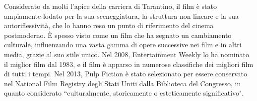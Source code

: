 \documentclass[12pt]{article} %
\begin{document}
\begin{flushleft}
    Considerato da molti l'apice della carriera di Tarantino, il film è stato ampiamente lodato per la sua sceneggiatura, la struttura non lineare e la sua autoriflessività, 
    che lo hanno reso un punto di riferimento del cinema postmoderno. 
    È spesso visto come un film che ha segnato un cambiamento culturale, influenzando una vasta gamma di opere successive nei film e in 
    altri media, grazie al suo stile unico. 
    Nel 2008, Entertainment Weekly lo ha nominato il miglior film dal 1983, e il film è apparso in numerose classifiche dei migliori film di tutti i tempi. 
    Nel 2013, Pulp Fiction è stato selezionato per essere conservato nel National Film Registry degli Stati Uniti dalla Biblioteca del Congresso, in quanto considerato ``culturalmente, storicamente o esteticamente significativo".
\end{flushleft}
\break
\end{document}
